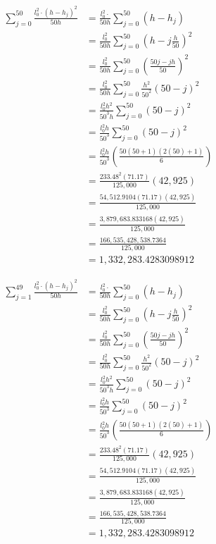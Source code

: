 \documentclass[12pt]{article}
\begin{document}
\begin{enumerate}
    
        \begin{minipage}[H]{0.45\textwidth}
            \raggedleft
        \begin{align*}
            \sum_{j=0}^{50} \frac{l_0^2 \cdot (h - h_j)^2}{50h} &= \frac{l_0^2 \cdot }{50h}  \sum_{j=0}^{50}(h - h_j)\\
            &= \frac{l_0^2}{50h}  \sum_{j=0}^{50} \left(h -j \frac{h}{50} \right)^2\\
            &= \frac{l_0^2}{50h}  \sum_{j=0}^{50} \left(\frac{50j-jh}{50} \right)^2\\
            &= \frac{l_0^2}{50h}  \sum_{j=0}^{50} \frac{h^2}{50^2} \left(50-j \right)^2\\
            &= \frac{l_0^2 h^2}{50^3h}  \sum_{j=0}^{50} \left(50-j \right)^2\\
            &= \frac{l_0^2 h}{50^3}  \sum_{j=0}^{50} \left(50-j \right)^2\\
            &= \frac{l_0^2 h}{50^3} \left(\frac{50(50+1)(2(50)+1)}{6} \right) \\
            &= \frac{233.48^2 (71.17)}{125,000}(42,925)\\
            &= \frac {54,512.9104(71.17)(42,925)}{125,000}\\
            &= \frac {3,879,683.833168(42,925)}{125,000}\\
            &= \frac {166,535,428,538.7364}{125,000}\\
            &= 1,332,283.4283098912
        \end{align*}
        \end{minipage}
        \hfill
        \begin{minipage}[H]{0.45\textwidth}
            \raggedleft
            \begin{align*}
            \sum_{j=1}^{49} \frac{l_0^2 \cdot (h - h_j)^2}{50h} &= \frac{l_0^2 \cdot }{50h}  \sum_{j=0}^{50}(h - h_j)\\
            &= \frac{l_0^2}{50h}  \sum_{j=0}^{50} \left(h -j \frac{h}{50} \right)^2\\
            &= \frac{l_0^2}{50h}  \sum_{j=0}^{50} \left(\frac{50j-jh}{50} \right)^2\\
            &= \frac{l_0^2}{50h}  \sum_{j=0}^{50} \frac{h^2}{50^2} \left(50-j \right)^2\\
            &= \frac{l_0^2 h^2}{50^3h}  \sum_{j=0}^{50} \left(50-j \right)^2\\
            &= \frac{l_0^2 h}{50^3}  \sum_{j=0}^{50} \left(50-j \right)^2\\
            &= \frac{l_0^2 h}{50^3} \left(\frac{50(50+1)(2(50)+1)}{6} \right) \\
            &= \frac{233.48^2 (71.17)}{125,000}(42,925)\\
            &= \frac {54,512.9104(71.17)(42,925)}{125,000}\\
            &= \frac {3,879,683.833168(42,925)}{125,000}\\
            &= \frac {166,535,428,538.7364}{125,000}\\
            &= 1,332,283.4283098912
            \end{align*}    
        \end{minipage}
        

\end{enumerate}
\end{document}
